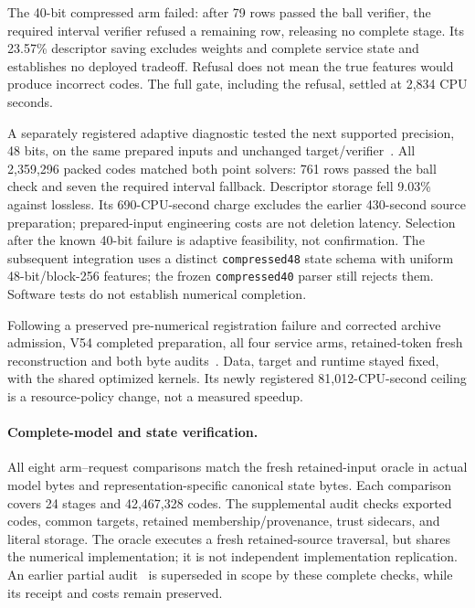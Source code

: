 \documentclass[10pt,twocolumn,letterpaper]{article}
\begin{document}
The 40-bit compressed arm failed: after 79 rows passed the ball verifier, the
required interval verifier refused a remaining row, releasing no complete stage.
Its 23.57\% descriptor saving excludes weights and complete service state and
establishes no deployed tradeoff. Refusal does not mean the true features would
produce incorrect codes. The full gate, including the refusal, settled at 2,834
CPU seconds.

A separately registered adaptive diagnostic tested the next supported precision,
48 bits, on the same prepared inputs and unchanged target/verifier~\cite{v52}.
All 2,359,296 packed codes matched both point solvers: 761 rows passed the ball
check and seven the required interval fallback. Descriptor storage fell 9.03\%
against lossless. Its 690-CPU-second charge excludes the earlier 430-second source
preparation; prepared-input engineering costs are not deletion latency. Selection
after the known 40-bit failure is adaptive feasibility, not confirmation.
The subsequent integration uses a distinct \texttt{compressed48} state schema
with uniform 48-bit/block-256 features; the frozen \texttt{compressed40} parser
still rejects them. Software tests do not establish numerical completion.

Following a preserved pre-numerical registration failure and corrected archive
admission, V54 completed preparation, all four service arms, retained-token fresh
reconstruction and both byte audits~\cite{v54,v58terminal}. Data, target and
runtime stayed fixed, with the shared optimized kernels. Its newly registered
81,012-CPU-second ceiling is a resource-policy change, not a measured speedup.

\paragraph{Complete-model and state verification.}
All eight arm--request comparisons match the fresh retained-input oracle in
actual model bytes and representation-specific canonical state bytes. Each
comparison covers 24 stages and 42,467,328 codes. The supplemental audit checks
exported codes, common targets, retained membership/provenance, trust sidecars,
and literal storage. The oracle executes a fresh retained-source traversal,
but shares the numerical implementation; it is not independent implementation
replication. An earlier partial audit~\cite{v57prefix} is superseded in scope
by these complete checks, while its receipt and costs remain preserved.
\end{document}
